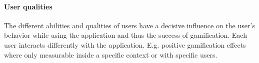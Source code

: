\paragraph*{User qualities}

The different abilities and qualities of users have a decisive influence on the user's behavior while using the application and thus the success of gamification. Each user interacts differently with the application. E.g. positive gamification effects where only measurable inside a specific context or with specific users. \cite[p. 3029, 3030]{hamariDoesGamificationWork2014}


\newpage
